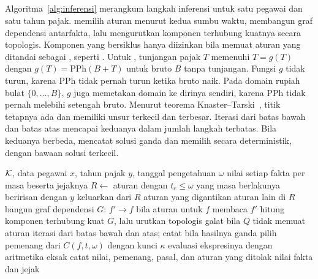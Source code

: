 
\subsection{}
\label{subsec:engine}

Algoritma~\ref{alg:inferensi} merangkum langkah inferensi untuk satu pegawai dan satu tahun pajak.  memilih aturan menurut kedua sumbu waktu, membangun graf dependensi antarfakta, lalu mengurutkan komponen terhubung kuatnya secara topologis. Komponen yang bersiklus hanya diizinkan bila memuat aturan yang ditandai sebagai , seperti . Untuk , tunjangan pajak $T$ memenuhi $T = g(T)$ dengan $g(T) = \mathrm{PPh}(B + T)$ untuk bruto $B$ tanpa tunjangan. Fungsi $g$ tidak turun, karena PPh tidak pernah turun ketika bruto naik. Pada domain rupiah bulat $\{0, \dots, B\}$, $g$ juga memetakan domain ke dirinya sendiri, karena PPh tidak pernah melebihi setengah bruto. Menurut teorema Knaster--Tarski~\cite{tarski1955lattice}, titik tetapnya ada dan memiliki unsur terkecil dan terbesar. Iterasi dari batas bawah dan batas atas mencapai keduanya dalam jumlah langkah terbatas. Bila keduanya berbeda,  mencatat solusi ganda dan memilih secara deterministik, dengan bawaan solusi terkecil.

\begin{algorithm}[t]
\caption{Inferensi untuk satu pegawai dan satu tahun pajak}
\label{alg:inferensi}
\footnotesize
\begin{algorithmic}[1]
\Require $\mathcal{K}$, data pegawai $x$, tahun pajak $y$, tanggal pengetahuan $\omega$
\Ensure nilai setiap fakta per masa beserta jejaknya
\State $R \gets$ aturan dengan $t_c \le \omega$ yang masa berlakunya beririsan dengan $y$
\State keluarkan dari $R$ aturan yang digantikan aturan lain di $R$
\State bangun graf dependensi $G$: $f' \to f$ bila aturan untuk $f$ membaca $f'$
\State hitung komponen terhubung kuat $G$, lalu urutkan topologis
    \State galat bila $Q$ tidak memuat aturan 
    \State iterasi dari batas bawah dan atas; catat bila hasilnya ganda
  \Else
      \State pilih pemenang dari $C(f, t, \omega)$ dengan kunci $\kappa$
      \State evaluasi ekspresinya dengan aritmetika eksak
      \State catat nilai, pemenang, pasal, dan aturan yang ditolak
    \EndFor
  \EndIf
\EndFor
\State \Return nilai fakta dan jejak
\end{algorithmic}
\end{algorithm}

